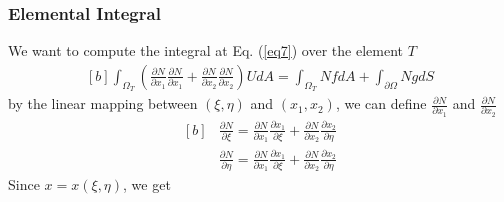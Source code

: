 \documentclass[]{article}
\begin{document}
\subsubsection{Elemental Integral} \label{sec: elem int}
  We want to compute the integral at Eq. (\ref{eq7}) over the element $T$
\begin{equation}\label{eq13}
	\begin{aligned}[b]
		\int_{\Omega_{T}} (\frac{\partial N}{\partial x_{1}}
		\frac{\partial N}{\partial x_{1}}+\frac{\partial N}{\partial x_{2}} 
		\frac{\partial N}{\partial x_{2}})U dA = \int_{\Omega_{T}} Nf dA + \int_{\partial \Omega} Ng dS
	\end{aligned}
\end{equation}
by the linear mapping between $(\xi,\eta)$ and $(x_{1},x_2)$, we can define $\frac{\partial N}{\partial x_{1}}$ and $\frac{\partial N}{\partial x_{2}}$
\begin{equation}\label{eq14}
	\begin{aligned}[b]
&
		\frac{\partial N}{\partial \xi} = \frac{\partial N}{\partial x_{1}}\frac{\partial x_{1}}{\partial \xi}+\frac{\partial N}{\partial x_{2}}\frac{\partial x_{2}}{\partial \eta}\\
& 
		\frac{\partial N}{\partial \eta} = \frac{\partial N}{\partial x_{1}}\frac{\partial x_{1}}{\partial \xi}+\frac{\partial N}{\partial x_{2}}\frac{\partial x_{2}}{\partial \eta}
	\end{aligned}
\end{equation}
Since $x=x(\xi,\eta)$, we get
\end{document}
